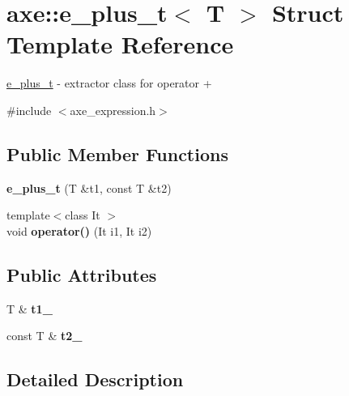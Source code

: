 \hypertarget{structaxe_1_1e__plus__t}{\section{axe\+:\+:e\+\_\+plus\+\_\+t$<$ T $>$ Struct Template Reference}
\label{structaxe_1_1e__plus__t}
}


\hyperlink{structaxe_1_1e__plus__t}{e\+\_\+plus\+\_\+t} -\/ extractor class for operator +  




{\ttfamily \#include $<$axe\+\_\+expression.\+h$>$}

\subsection*{Public Member Functions}
\begin{DoxyCompactItemize}
\item 
\hypertarget{structaxe_1_1e__plus__t_a5fdb980d7f46526ad25db8fd0475f33b}{{\bfseries e\+\_\+plus\+\_\+t} (T \&t1, const T \&t2)}\label{structaxe_1_1e__plus__t_a5fdb980d7f46526ad25db8fd0475f33b}

\item 
\hypertarget{structaxe_1_1e__plus__t_a4f0f008ebdc4d2ef91c28d58a7f17804}{{\footnotesize template$<$class It $>$ }\\void {\bfseries operator()} (It i1, It i2)}\label{structaxe_1_1e__plus__t_a4f0f008ebdc4d2ef91c28d58a7f17804}

\end{DoxyCompactItemize}
\subsection*{Public Attributes}
\begin{DoxyCompactItemize}
\item 
\hypertarget{structaxe_1_1e__plus__t_ab6918279e1c3172d5672a69c56d29fe8}{T \& {\bfseries t1\+\_\+}}\label{structaxe_1_1e__plus__t_ab6918279e1c3172d5672a69c56d29fe8}

\item 
\hypertarget{structaxe_1_1e__plus__t_a8e2140ea737cb922e1ba45b79942a7cd}{const T \& {\bfseries t2\+\_\+}}\label{structaxe_1_1e__plus__t_a8e2140ea737cb922e1ba45b79942a7cd}

\end{DoxyCompactItemize}


\subsection{Detailed Description}
